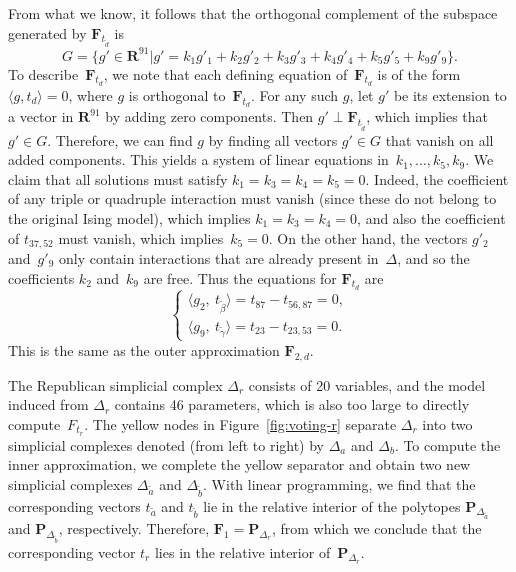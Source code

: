 \documentclass[aos,noinfoline]{imsart}
\def\R{{\mathbf R}}
\def\<{\langle}
\def\>{\rangle}
\newcommand{\Fbf}{\mathbf{F}}
\newcommand{\Pbf}{\mathbf{P}}
\theoremstyle{remark}
\theoremstyle{definition}
\begin{document}
From what we know, it follows that the orthogonal complement of the subspace generated by $\Fbf_{t_{\tilde{d}}}$ is
\begin{equation*}
  G=\Big\{g' \in\R^{91}\Big|g'=k_1g'_1+k_2g'_2+k_3g'_3+k_4g'_4+k_5g'_5+k_9g'_9\Big\}.
\end{equation*}
To describe~$\Fbf_{t_{d}}$, we note that each defining equation of~$\Fbf_{t_{d}}$ is of the form $\<g,t_d\>=0$, where $g$ is orthogonal to~$\Fbf_{t_{d}}$.  For any such $g$, let $g'$ be its extension to a vector in $\R^{91}$ by adding zero components.  Then $g'\perp\Fbf_{t_{\tilde d}}$, which implies that $g'\in G$.
%
Therefore, we can find  $g$ by finding all vectors $g'\in G$ that vanish on all added components.  This yields a system of linear equations in~$k_{1},\dots,k_{5},k_{9}$.  We claim that all solutions must satisfy
$k_1=k_3=k_4=k_5=0$. Indeed, the coefficient of any triple or quadruple interaction must vanish (since these do not
belong to the original Ising model), which implies $k_1=k_3=k_4=0$, and also the coefficient of $t_{37,52}$ must vanish,
which implies~$k_{5}=0$.  On the other hand, the vectors $g'_{2}$ and~$g'_{9}$ only contain interactions that are
already present in~$\Delta$, and so the coefficients $k_{2}$ and~$k_{9}$ are free.  Thus the equations for $\Fbf_{t_d}$
are
\begin{equation} 
  \label{eq:face5}
  \begin{cases}
    \<g_2,\  t_{\tilde{\beta}} \> =t_{87}-t_{56,87}=0, \\
    \<g_9,\  t_{\tilde{\gamma}} \> =t_{23}-t_{23,53}=0.
  \end{cases}
\end{equation}
This is the same as the outer approximation $\Fbf_{2,d}$.

The Republican simplicial complex $\Delta_r$ consists of 20 variables, and the model induced from $\Delta_r$ contains 46
parameters, %
which is also too large to directly
compute~$F_{t_{r}}$.  The yellow nodes in Figure~\ref{fig:voting-r} separate $\Delta_r$ into two simplicial complexes
denoted (from left to right) by $\Delta_a$ and $\Delta_b$.
To compute the inner approximation, we complete the yellow separator and obtain two new simplicial complexes
$\Delta_{\tilde{a}}$ and $\Delta_{\tilde{b}}$.  With linear programming, we find that the corresponding
vectors $t_{\tilde{a}}$ and $t_{\tilde{b}}$ lie in the relative interior of the polytopes $\Pbf_{\Delta_{\tilde{a}}}$ and
$\Pbf_{\Delta_{\tilde{b}}}$, respectively.  Therefore, $\Fbf_1=\Pbf_{\Delta_r}$, from which
we conclude that the corresponding vector $t_r$ lies in the relative interior of~$\Pbf_{\Delta_r}$.
\end{document}
